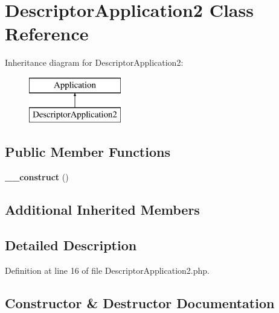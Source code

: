 \section{Descriptor\+Application2 Class Reference}
\label{class_symfony_1_1_component_1_1_console_1_1_tests_1_1_fixtures_1_1_descriptor_application2}
Inheritance diagram for Descriptor\+Application2\+:\begin{figure}[H]
\begin{center}
\leavevmode
\includegraphics[height=2.000000cm]{class_symfony_1_1_component_1_1_console_1_1_tests_1_1_fixtures_1_1_descriptor_application2}
\end{center}
\end{figure}
\subsection*{Public Member Functions}
\begin{DoxyCompactItemize}
\item 
{\bf \+\_\+\+\_\+construct} ()
\end{DoxyCompactItemize}
\subsection*{Additional Inherited Members}


\subsection{Detailed Description}


Definition at line 16 of file Descriptor\+Application2.\+php.



\subsection{Constructor \& Destructor Documentation}
